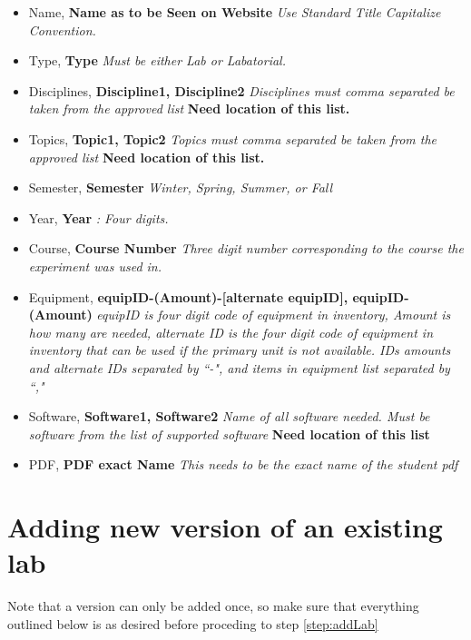 \documentclass[justified]{book}
\begin{document}
\begin{enumerate}
\begin{itemize}
\item Name, \textbf{Name as to be Seen on Website} \textit{ Use Standard Title Capitalize Convention.}
\item Type, \textbf{Type} \textit{ Must be either Lab or Labatorial.}
\item Disciplines, \textbf{Discipline1, Discipline2} \textit{ Disciplines must comma separated be taken from the approved list} \textbf{Need location of this list.}
\item Topics, \textbf{Topic1, Topic2} \textit{ Topics must comma separated be taken from the approved list} \textbf{Need location of this list.}
\item Semester, \textbf{Semester} \textit{ Winter, Spring, Summer, or Fall}
\item Year, \textbf{Year} \textit{: Four digits.}
\item Course, \textbf{Course Number} \textit{ Three digit number corresponding to the course the experiment was used in.}
\item Equipment, \textbf{equipID-(Amount)-[alternate equipID], equipID-(Amount)} \textit{ equipID is four digit code of equipment in inventory, Amount is how many are needed, alternate ID is the four digit code of equipment in inventory that can be used if the primary unit is not available. IDs amounts and alternate IDs separated by ``-", and items in equipment list separated by ``,"}
\item Software, \textbf{Software1, Software2} \textit{ Name of all software needed. Must be software from the list of supported software} \textbf{Need location of this list}
\item PDF, \textbf{PDF exact Name} \textit{ This needs to be the exact name of the student pdf}
\end{itemize}	

\end{enumerate}

\section{Adding new version of an existing lab}

Note that a version can only be added once, so make sure that everything outlined below is as desired before proceding to step \ref{step:addLab}
\end{document}
